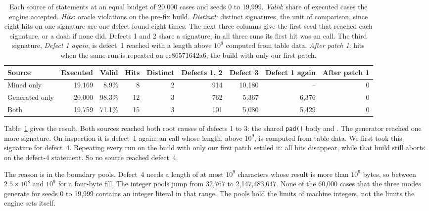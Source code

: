 \begin{table}[t]
  \caption{Each source of statements at an equal budget of 20{,}000 cases and
  seeds 0 to 19{,}999. \emph{Valid}: share of executed cases the engine
  accepted. \emph{Hits}: oracle violations on the pre-fix build. \emph{Distinct}:
  distinct signatures, the unit of comparison, since eight hits on one signature are one defect found
  eight times. The next three columns give the first seed that reached each
  signature, or a dash if none did. Defects 1 and 2 share a signature; in all
  three runs its first hit was an  call. The third signature,
  \emph{Defect 1 again}, is defect~1 reached with a length above $10^9$ computed from table data.
  \emph{After patch 1}: hits when the same run is repeated on ec86571642a6, the
  build with only our first patch.}
  \label{tab:ablation}
  \footnotesize
  \begin{tabular}{@{}lrrrrrrrr@{}}
    \toprule
    Source & Executed & Valid & Hits & Distinct & Defects 1, 2 & Defect 3 & Defect 1 again & After patch 1 \\
    \midrule
    Mined only     & 19{,}169 &  8.9\% &  8 & 2 & 914 & 10{,}180 & --       & 0 \\
    Generated only & 20{,}000 & 98.3\% & 12 & 3 & 762 & 5{,}367  & 6{,}376  & 0 \\
    Both           & 19{,}759 & 71.1\% & 15 & 3 & 101 & 5{,}080  & 5{,}429  & 0 \\
    \bottomrule
  \end{tabular}
\end{table}

Table~\ref{tab:ablation} gives the result. Both sources reached both root causes
of defects 1 to 3: the shared \texttt{pad()} body and . The generator
reached one more signature. On inspection it is defect~1 again: an 
call whose length, above $10^9$, is computed from table data. We first took this
signature for defect~4. Repeating every run on the build with only our first
patch settled it: all hits disappear, while that build still aborts on the
defect-4 statement. So no source reached defect~4.

The reason is in the boundary pools. Defect~4 needs a length of at most $10^9$
characters whose result is more than $10^9$ bytes, so between $2.5\times10^8$ and
$10^9$ for a four-byte fill. The integer pools jump from 32{,}767 to
2{,}147{,}483{,}647. None of the 60{,}000 cases that the three modes generate for
seeds 0 to 19{,}999 contains an integer literal in that range. The pools hold the limits of machine integers, not the
limits the engine sets itself.

